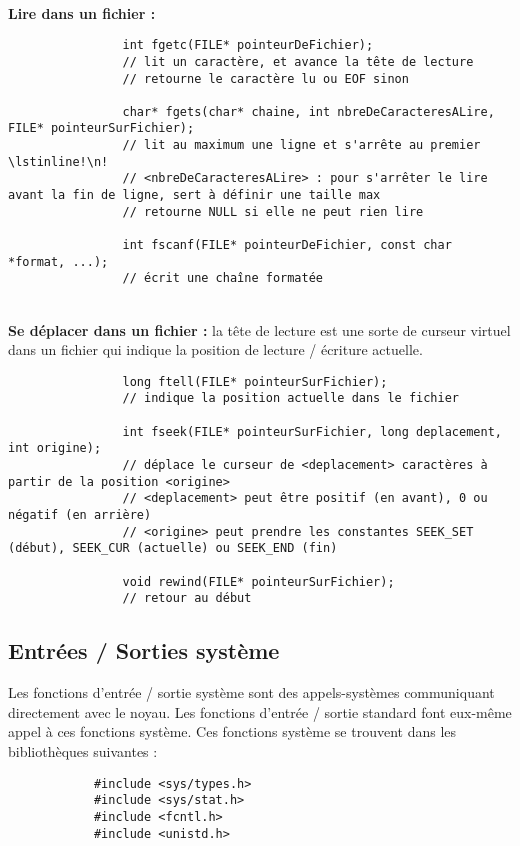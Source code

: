 		~\\\textbf{Lire dans un fichier :}
		
			\begin{lstlisting}
				int fgetc(FILE* pointeurDeFichier);
				// lit un caractère, et avance la tête de lecture
				// retourne le caractère lu ou EOF sinon
				
				char* fgets(char* chaine, int nbreDeCaracteresALire, FILE* pointeurSurFichier);
				// lit au maximum une ligne et s'arrête au premier \lstinline!\n!
				// <nbreDeCaracteresALire> : pour s'arrêter le lire avant la fin de ligne, sert à définir une taille max
				// retourne NULL si elle ne peut rien lire
				
				int fscanf(FILE* pointeurDeFichier, const char *format, ...);
				// écrit une chaîne formatée
			\end{lstlisting}
			
		~\\\textbf{Se déplacer dans un fichier :} la tête de lecture est une sorte de curseur virtuel dans un fichier qui indique la position de lecture / écriture actuelle.
		
			\begin{lstlisting}
				long ftell(FILE* pointeurSurFichier);
				// indique la position actuelle dans le fichier
				
				int fseek(FILE* pointeurSurFichier, long deplacement, int origine);
				// déplace le curseur de <deplacement> caractères à partir de la position <origine>
				// <deplacement> peut être positif (en avant), 0 ou négatif (en arrière)
				// <origine> peut prendre les constantes SEEK_SET (début), SEEK_CUR (actuelle) ou SEEK_END (fin)
				
				void rewind(FILE* pointeurSurFichier);
				// retour au début
			\end{lstlisting}
			
		
	\subsection{Entrées / Sorties système}
		Les fonctions d'entrée / sortie système sont des appels-systèmes communiquant directement avec le noyau. Les fonctions d'entrée / sortie standard font eux-même appel à ces fonctions système. Ces fonctions système se trouvent dans les bibliothèques suivantes :
		\begin{lstlisting}
			#include <sys/types.h>
			#include <sys/stat.h>
			#include <fcntl.h>
			#include <unistd.h>
		\end{lstlisting}
		
